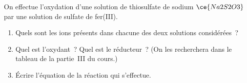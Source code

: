 On effectue l'oxydation d'une solution de thiosulfate de sodium $\ce{Na2S2O3}$
par une solution de sulfate de fer(III).
\begin{enumerate}
    \item Quels sont les ions présents dans chacune des deux solutions
          considérées~?
    \item Quel est l'oxydant~? Quel est le réducteur~? (On les recherchera dans
          le tableau de la partie~III du cours.)
    \item Écrire l'équation de la réaction qui s'effectue.
\end{enumerate}

